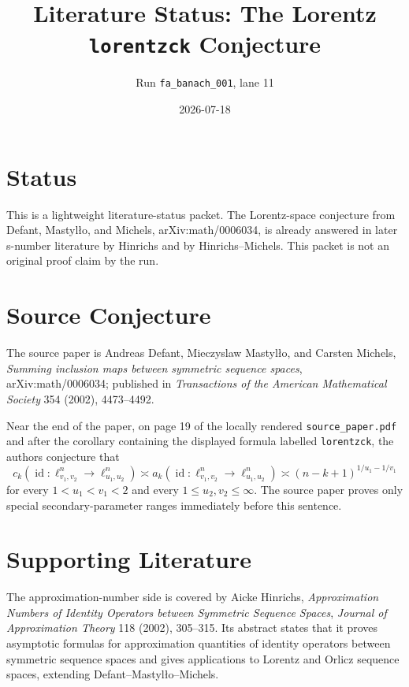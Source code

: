 \documentclass[11pt]{article}
\title{Literature Status: The Lorentz \texttt{lorentzck} Conjecture}
\author{Run \texttt{fa\_banach\_001}, lane 11}
\date{2026-07-18}
\begin{document}
\maketitle

\section*{Status}

This is a lightweight literature-status packet.  The Lorentz-space conjecture
from Defant, Mastyl\l{}o, and Michels, arXiv:math/0006034, is already answered
in later s-number literature by Hinrichs and by Hinrichs--Michels.  This packet
is not an original proof claim by the run.

\section*{Source Conjecture}

The source paper is Andreas Defant, Mieczyslaw Mastyl\l{}o, and Carsten
Michels, \emph{Summing inclusion maps between symmetric sequence spaces},
arXiv:math/0006034; published in \emph{Transactions of the American
Mathematical Society} 354 (2002), 4473--4492.

Near the end of the paper, on page 19 of the locally rendered
\texttt{source\_paper.pdf} and after the corollary containing the displayed
formula labelled \texttt{lorentzck}, the authors conjecture that
\[
  c_k\!\left(\operatorname{id}:
    \ell_{v_1,v_2}^n \to \ell_{u_1,u_2}^n\right)
  \asymp
  a_k\!\left(\operatorname{id}:
    \ell_{v_1,v_2}^n \to \ell_{u_1,u_2}^n\right)
  \asymp
  (n-k+1)^{1/u_1-1/v_1}
\]
for every \(1<u_1<v_1<2\) and every \(1\leq u_2,v_2\leq\infty\).  The source
paper proves only special secondary-parameter ranges immediately before this
sentence.

\section*{Supporting Literature}

The approximation-number side is covered by Aicke Hinrichs,
\emph{Approximation Numbers of Identity Operators between Symmetric Sequence
Spaces}, \emph{Journal of Approximation Theory} 118 (2002), 305--315.  Its
abstract states that it proves asymptotic formulas for approximation quantities
of identity operators between symmetric sequence spaces and gives applications
to Lorentz and Orlicz sequence spaces, extending Defant--Mastyl\l{}o--Michels.
\end{document}
